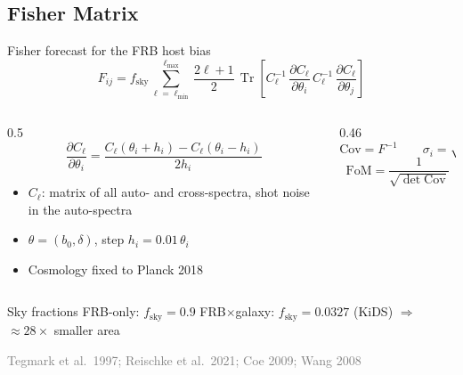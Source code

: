 \documentclass[aspectratio=1610, 10pt]{beamer}
\newcommand{\source}[1]{{\par\hfill\tiny\textcolor{gray}{#1}\par}}
\begin{document}
\subsection{Fisher Matrix}
\begin{frame}{Fisher forecast for the FRB host bias}
  \begin{equation*}
    F_{ij} = f_{\mathrm{sky}} \sum_{\ell=\ell_{\mathrm{min}}}^{\ell_{\mathrm{max}}} \frac{2\ell+1}{2}\,
    \operatorname{Tr}\left[ C_{\ell}^{-1}\, \frac{\partial C_{\ell}}{\partial \theta_i}\,
    C_{\ell}^{-1}\, \frac{\partial C_{\ell}}{\partial \theta_j} \right]
  \end{equation*}
  \begin{columns}[t]
    \begin{column}{0.5\textwidth}
      \vspace{-2ex}
      \begin{equation*}
        \frac{\partial C_{\ell}}{\partial \theta_i} = \frac{C_{\ell}(\theta_i + h_i) - C_{\ell}(\theta_i - h_i)}{2 h_i}
      \end{equation*}
      \begin{itemize}
        \item $C_\ell$: matrix of all auto- and cross-spectra, shot noise in the auto-spectra
        \item $\theta = (b_0, \delta)$, step $h_i = 0.01\,\theta_i$
        \item Cosmology fixed to Planck 2018
      \end{itemize}
    \end{column}
    \begin{column}{0.46\textwidth}
      \vspace{-2ex}
      \begin{equation*}
        \mathrm{Cov} = F^{-1}
        \qquad
        \sigma_i = \sqrt{\mathrm{Cov}_{ii}}
      \end{equation*}
      \begin{equation*}
        \mathrm{FoM} = \frac{1}{\sqrt{\det \mathrm{Cov}}}
      \end{equation*}
    \end{column}
  \end{columns}
  \medskip
  \begin{block}{Sky fractions}
    FRB-only: $f_{\mathrm{sky}} = 0.9$ \qquad
    FRB$\times$galaxy: $f_{\mathrm{sky}} = 0.0327$ (KiDS) $\Rightarrow$ \alert{$\approx 28\times$ smaller area}
  \end{block}
  \source{Tegmark et al.\ 1997; Reischke et al.\ 2021; Coe 2009; Wang 2008}
\end{frame}
\end{document}
